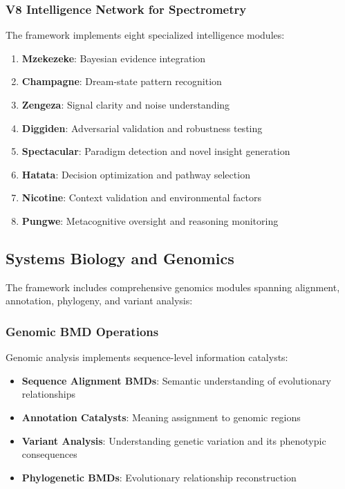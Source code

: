 \documentclass[12pt,a4paper,twoside]{article}
\begin{document}
\begin{itemize}
\subsubsection{V8 Intelligence Network for Spectrometry}

The framework implements eight specialized intelligence modules:

\begin{enumerate}
\item \textbf{Mzekezeke}: Bayesian evidence integration
\item \textbf{Champagne}: Dream-state pattern recognition
\item \textbf{Zengeza}: Signal clarity and noise understanding
\item \textbf{Diggiden}: Adversarial validation and robustness testing
\item \textbf{Spectacular}: Paradigm detection and novel insight generation
\item \textbf{Hatata}: Decision optimization and pathway selection
\item \textbf{Nicotine}: Context validation and environmental factors
\item \textbf{Pungwe}: Metacognitive oversight and reasoning monitoring
\end{enumerate}

\subsection{Systems Biology and Genomics}

The framework includes comprehensive genomics modules spanning alignment, annotation, phylogeny, and variant analysis:

\subsubsection{Genomic BMD Operations}

Genomic analysis implements sequence-level information catalysts:

\begin{itemize}
\item \textbf{Sequence Alignment BMDs}: Semantic understanding of evolutionary relationships
\item \textbf{Annotation Catalysts}: Meaning assignment to genomic regions
\item \textbf{Variant Analysis}: Understanding genetic variation and its phenotypic consequences
\item \textbf{Phylogenetic BMDs}: Evolutionary relationship reconstruction
\end{itemize}


\end{itemize}
\end{document}

